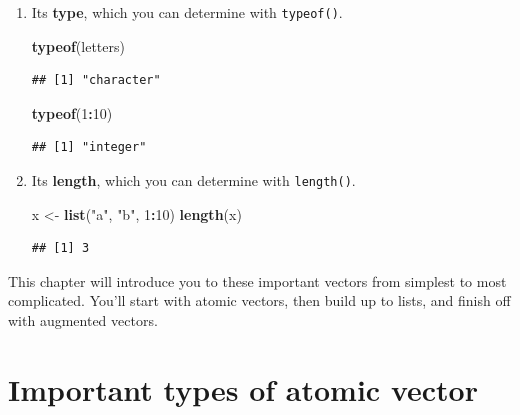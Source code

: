 \documentclass[
]{book}
\newenvironment{Shaded}{\begin{snugshade}}{\end{snugshade}}
\newcommand{\DecValTok}[1]{\textcolor[rgb]{0.00,0.00,0.81}{#1}}
\newcommand{\KeywordTok}[1]{\textcolor[rgb]{0.13,0.29,0.53}{\textbf{#1}}}
\newcommand{\NormalTok}[1]{#1}
\newcommand{\OperatorTok}[1]{\textcolor[rgb]{0.81,0.36,0.00}{\textbf{#1}}}
\newcommand{\StringTok}[1]{\textcolor[rgb]{0.31,0.60,0.02}{#1}}
\begin{document}
\begin{enumerate}
\def\labelenumi{\arabic{enumi}.}
\item
  Its \textbf{type}, which you can determine with \texttt{typeof()}.

\begin{Shaded}
\begin{Highlighting}[]
\KeywordTok{typeof}\NormalTok{(letters)}
\end{Highlighting}
\end{Shaded}

\begin{verbatim}
## [1] "character"
\end{verbatim}

\begin{Shaded}
\begin{Highlighting}[]
\KeywordTok{typeof}\NormalTok{(}\DecValTok{1}\OperatorTok{:}\DecValTok{10}\NormalTok{)}
\end{Highlighting}
\end{Shaded}

\begin{verbatim}
## [1] "integer"
\end{verbatim}
\item
  Its \textbf{length}, which you can determine with \texttt{length()}.

\begin{Shaded}
\begin{Highlighting}[]
\NormalTok{x <-}\StringTok{ }\KeywordTok{list}\NormalTok{(}\StringTok{"a"}\NormalTok{, }\StringTok{"b"}\NormalTok{, }\DecValTok{1}\OperatorTok{:}\DecValTok{10}\NormalTok{)}
\KeywordTok{length}\NormalTok{(x)}
\end{Highlighting}
\end{Shaded}

\begin{verbatim}
## [1] 3
\end{verbatim}
\end{enumerate}

This chapter will introduce you to these important vectors from simplest to most complicated. You'll start with atomic vectors, then build up to lists, and finish off with augmented vectors.

\hypertarget{important-types-of-atomic-vector}{%
\section{Important types of atomic vector}\label{important-types-of-atomic-vector}}
\end{document}
